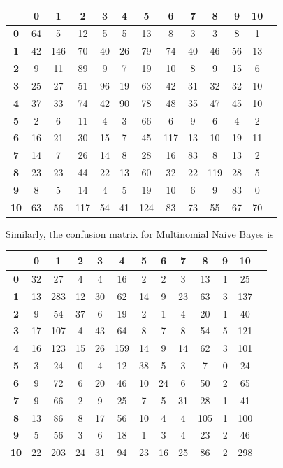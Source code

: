 \documentclass[11pt]{article}
\begin{document}
\centering
\begin{tabular}{c|cccccccccccc|}
& \textbf{0} & \textbf{1}& \textbf{2} & \textbf{3} & \textbf{4} & \textbf{5} & \textbf{6} & \textbf{7}& \textbf{8} & \textbf{9} & \textbf{10} \\
\hline
\textbf{0} & 64& 5& 12& 5& 5& 13& 8& 3& 3& 8& 1 \\
\textbf{1}  & 42& 146& 70& 40& 26& 79& 74& 40& 46& 56& 13 \\
\textbf{2} & 9& 11& 89& 9& 7& 19& 10& 8& 9& 15& 6 \\
\textbf{3}  & 25& 27& 51& 96& 19& 63& 42& 31& 32& 32& 10 \\
\textbf{4}  & 37& 33& 74& 42& 90& 78& 48& 35& 47& 45& 10 \\
\textbf{5}  & 2& 6& 11& 4& 3& 66& 6& 9& 6& 4& 2 \\
\textbf{6}  & 16& 21& 30& 15& 7& 45& 117& 13& 10& 19& 11 \\
\textbf{7}  & 14& 7& 26& 14& 8& 28& 16& 83& 8& 13& 2 \\
\textbf{8}  & 23& 23& 44& 22& 13& 60& 32& 22& 119& 28& 5 \\
\textbf{9}  & 8& 5& 14& 4& 5& 19& 10& 6& 9& 83& 0 \\
\textbf{10}  & 63& 56& 117& 54& 41& 124& 83& 73& 55& 67& 70 \\
\end{tabular}
\flushleft

Similarly, the confusion matrix for Multinomial Naive Bayes is 

\centering
\begin{tabular}{c|cccccccccccc|}
& \textbf{0} & \textbf{1}& \textbf{2} & \textbf{3} & \textbf{4} & \textbf{5} & \textbf{6} & \textbf{7}& \textbf{8} & \textbf{9} & \textbf{10} \\
\hline
\textbf{0} & 32& 27& 4& 4& 16& 2& 2& 3& 13& 1& 25 \\
\textbf{1} & 13& 283& 12& 30& 62& 14& 9& 23& 63& 3& 137 \\
\textbf{2} & 9& 54& 37& 6& 19& 2& 1& 4& 20& 1& 40 \\
\textbf{3} & 17& 107& 4& 43& 64& 8& 7& 8& 54& 5& 121 \\
\textbf{4} & 16& 123& 15& 26& 159& 14& 9& 14& 62& 3& 101 \\
\textbf{5} & 3& 24& 0& 4& 12& 38& 5& 3& 7& 0& 24 \\
\textbf{6} & 9& 72& 6& 20& 46& 10& 24& 6& 50& 2& 65 \\
\textbf{7} & 9& 66& 2& 9& 25& 7& 5& 31& 28& 1& 41 \\
\textbf{8} & 13& 86& 8& 17& 56& 10& 4& 4& 105& 1& 100 \\
\textbf{9} & 5& 56& 3& 6& 18& 1& 3& 4& 23& 2& 46 \\
\textbf{10} & 22& 203& 24& 31& 94& 23& 16& 25& 86& 2& 298 \\
\end{tabular}
\flushleft
\end{document}
